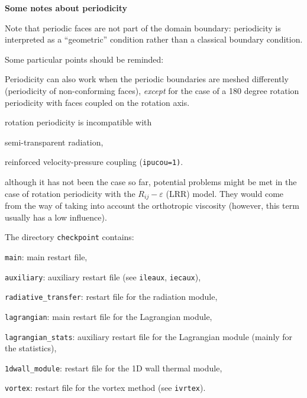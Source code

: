 {{{{{\bf Some notes about periodicity}

Note that periodic faces are not part of the domain boundary:
periodicity is interpreted as a ``geometric'' condition
rather than a classical boundary condition.

Some particular points should be reminded:
\begin{list}{-}{}
\item Periodicity can also work when the periodic boundaries are meshed
      differently (periodicity of non-conforming faces), {\it except} for
      the case of a 180 degree rotation periodicity with faces coupled
      on the rotation axis.
\item rotation periodicity is incompatible with
  \begin{list}{-}{}
  \item semi-transparent radiation,
  \item reinforced velocity-pressure coupling (\texttt{ipucou=1)}.
  \end{list}
\item although it has not been the case so far, potential problems might be met
      in the case of rotation periodicity with the $R_{ij}-\varepsilon$ (LRR)
      model. They would come from the way of taking into account the
      orthotropic viscosity (however, this term usually has a low influence).
\end{list}


The directory \texttt{checkpoint} contains:
\begin{list}{-}{}
\item \texttt{main}: main restart file,
\item \texttt{auxiliary}: auxiliary restart file (see \texttt{ileaux},
                       \texttt{iecaux}),
\item \texttt{radiative\_transfer}: restart file for the radiation module,
\item \texttt{lagrangian}: main restart file for the Lagrangian module,
\item \texttt{lagrangian\_stats}: auxiliary restart file for the Lagrangian module (mainly for the statistics),
\item \texttt{1dwall\_module}: restart file for the 1D wall thermal module,
\item \texttt{vortex}: restart file for the vortex method (see
                       \texttt{ivrtex}).
\end{list}

}}}}
